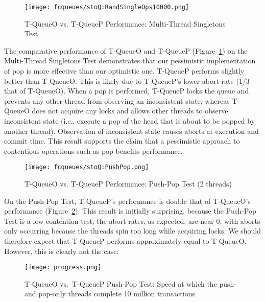 \begin{figure}[t!]
    \centering
	\begin{minipage}{\textwidth}
        {\texttt{[image: fcqueues/stoQ:RandSingleOps10000.png]}}
	\end{minipage}
    \caption{T-QueueO vs. T-QueueP Performance: Multi-Thread Singletons Test}
    \label{fig:stoqs}
\end{figure}

The comparative performance of T-QueueO and T-QueueP (Figure~\ref{fig:stoqs}) on the Multi-Thread Singletons Test demonstrates that our pessimistic implementation of pop is more effective than our optimistic one. T-QueueP performs slightly better than T-QueueO. This is likely due to T-QueueP's lower abort rate (1/3 that of T-QueueO). When a pop is performed, T-QueueP locks the queue and prevents any other thread from observing an inconsistent state, whereas T-QueueO does not acquire any locks and allows other threads to observe inconsistent state (i.e., execute a pop of the head that is about to be popped by another thread). Observation of inconsistent state causes aborts at execution and commit time.
This result supports the claim that a pessimistic approach to contentious operations such as pop benefits performance.

\begin{figure}[t]
    \centering
	\begin{minipage}{\textwidth}
        {\texttt{[image: fcqueues/stoQ:PushPop.png]}}
	\end{minipage}
    \caption{T-QueueO vs. T-QueueP Performance: Push-Pop Test (2 threads)}
    \label{fig:stoqs_pp}
\end{figure}

    On the Push-Pop Test, T-QueueP's performance is double that of T-QueueO's performance (Figure~\ref{fig:stoqs_pp}). This result is initially surprising, because the Push-Pop Test is a low-contention test; the abort rates, as expected, are near 0, with aborts only occurring because the threads spin too long while acquiring locks. We should therefore expect that T-QueueP performs approximately equal to T-QueueO. However, this is clearly not the case.

\begin{figure}[t]
    \centering
        {\texttt{[image: progress.png]}}
    \caption{T-QueueO vs.\ T-QueueP Push-Pop Test: Speed at which the push- and pop-only threads complete 10 million transactions}
    \label{fig:sto_progress}
\end{figure}

